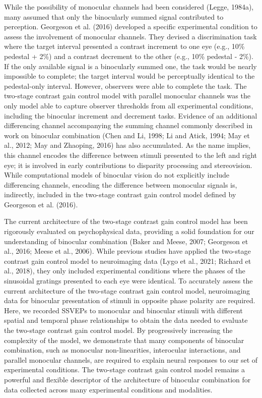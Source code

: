 \documentclass[review,
  12pt,
]{elsarticle}
\begin{document}
While the possibility of monocular channels had been considered (Legge,
1984a), many assumed that only the binocularly summed signal contributed
to perception. Georgeson et al. (2016) developed a specific experimental
condition to assess the involvement of monocular channels. They devised
a discrimination task where the target interval presented a contrast
increment to one eye (e.g., 10\% pedestal + 2\%) and a contrast
decrement to the other (e.g., 10\% pedestal - 2\%). If the only
available signal is a binocularly summed one, the task would be nearly
impossible to complete; the target interval would be perceptually
identical to the pedestal-only interval. However, observers were able to
complete the task. The two-stage contrast gain control model with
parallel monocular channels was the only model able to capture observer
thresholds from all experimental conditions, including the binocular
increment and decrement tasks. Evidence of an additional differencing
channel accompanying the summing channel commonly described in work on
binocular combination (Chen and Li, 1998; Li and Atick, 1994; May et
al., 2012; May and Zhaoping, 2016) has also accumulated. As the name
implies, this channel encodes the difference between stimuli presented
to the left and right eye; it is involved in early contributions to
disparity processing and stereovision. While computational models of
binocular vision do not explicitly include differencing channels,
encoding the difference between monocular signals is, indirectly,
included in the two-stage contrast gain control model defined by
Georgeson et al. (2016).

The current architecture of the two-stage contrast gain control model
has been rigorously evaluated on psychophysical data, providing a solid
foundation for our understanding of binocular combination (Baker and
Meese, 2007; Georgeson et al., 2016; Meese et al., 2006). While previous
studies have applied the two-stage contrast gain control model to
neuroimaging data (Lygo et al., 2021; Richard et al., 2018), they only
included experimental conditions where the phases of the sinusoidal
gratings presented to each eye were identical. To accurately assess the
current architecture of the two-stage contrast gain control model,
neuroimaging data for binocular presentation of stimuli in opposite
phase polarity are required. Here, we recorded SSVEPs to monocular and
binocular stimuli with different spatial and temporal phase
relationships to obtain the data needed to evaluate the two-stage
contrast gain control model. By progressively increasing the complexity
of the model, we demonstrate that many components of binocular
combination, such as monocular non-linearities, interocular
interactions, and parallel monocular channels, are required to explain
neural responses to our set of experimental conditions. The two-stage
contrast gain control model remains a powerful and flexible descriptor
of the architecture of binocular combination for data collected across
many experimental conditions and modalities.
\end{document}
